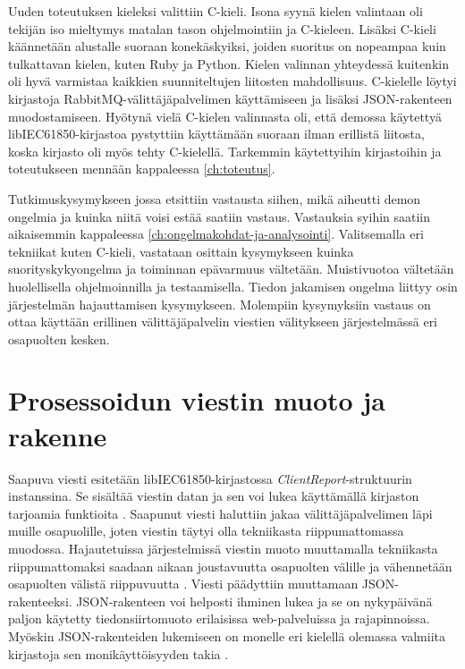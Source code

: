 Uuden toteutuksen kieleksi valittiin C-kieli. Isona syynä kielen valintaan oli tekijän iso mieltymys matalan tason ohjelmointiin ja C-kieleen. Lisäksi C-kieli käännetään alustalle suoraan konekäskyiksi, joiden suoritus on nopeampaa kuin tulkattavan kielen, kuten Ruby ja Python. Kielen valinnan yhteydessä kuitenkin oli hyvä varmistaa kaikkien suunniteltujen liitosten mahdollisuus. C-kielelle löytyi kirjastoja RabbitMQ-välittäjäpalvelimen käyttämiseen ja lisäksi JSON-rakenteen muodostamiseen. Hyötynä vielä C-kielen valinnasta oli, että demossa käytettyä libIEC61850-kirjastoa pystyttiin käyttämään suoraan ilman erillistä liitosta, koska kirjasto oli myös tehty C-kielellä. Tarkemmin käytettyihin kirjastoihin ja toteutukseen mennään kappaleessa \ref{ch:toteutus}.

Tutkimuskysymykseen jossa etsittiin vastausta siihen, mikä aiheutti demon ongelmia ja kuinka niitä voisi estää saatiin vastaus. Vastauksia syihin saatiin aikaisemmin kappaleessa \ref{ch:ongelmakohdat-ja-analysointi}. Valitsemalla eri tekniikat kuten C-kieli, vastataan osittain kysymykseen kuinka suorityskykyongelma ja toiminnan epävarmuus vältetään. Muistivuotoa vältetään huolellisella ohjelmoinnilla ja testaamisella. Tiedon jakamisen ongelma liittyy osin järjestelmän hajauttamisen kysymykseen. Molempiin kysymyksiin vastaus on ottaa käyttään erillinen välittäjäpalvelin viestien välitykseen järjestelmässä eri osapuolten kesken.


\section{Prosessoidun viestin muoto ja rakenne}
Saapuva viesti esitetään libIEC61850-kirjastossa \emph{ClientReport}-struk\-tuu\-rin instanssina. Se sisältää viestin datan ja sen voi lukea käyttämällä kirjaston tarjoamia funktioita \mbox{\cite{libIEC61850-doc}}. Saapunut viesti haluttiin jakaa välittäjäpalvelimen läpi muille osapuolille, joten viestin täytyi olla tekniikasta riippumattomassa muodossa. Hajautetuissa järjestelmissä viestin muoto muuttamalla tekniikasta riippumattomaksi saadaan aikaan joustavuutta osapuolten välille ja vähennetään osapuolten välistä riippuvuutta \cite[s.~838]{distributed-systems-concepts-and-design}. Viesti päädyttiin muuttamaan JSON-rakenteeksi. JSON-rakenteen voi helposti ihminen lukea ja se on nykypäivänä paljon käytetty tiedonsiirtomuoto erilaisissa web-palveluissa ja rajapinnoissa. Myöskin JSON-rakenteiden lukemiseen on monelle eri kielellä olemassa valmiita kirjastoja sen monikäyttöisyyden takia \mbox{\cite{Patrizio2016}}.

